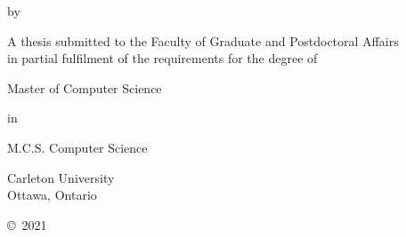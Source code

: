 \makeatletter
\begin{titlepage}
    \begin{center}
      \vspace*{1cm}
      {\Huge\bfseries \@title}

      \vspace{1cm}
      by
      \vspace{1cm}

      {\bfseries \@author}

      \vfill

      A thesis submitted to the Faculty of Graduate and Postdoctoral Affairs\\
      in partial fulfilment of the requirements for the degree of

      \vspace{0.5cm}
      Master of Computer Science

      \vspace{0.5cm}
      in
      \vspace{0.5cm}

      M.C.S. Computer Science

      \vfill

      \vspace{1cm}
      Carleton University\\
      Ottawa, Ontario
      \vspace{1cm}

      \copyright{}~2021 \@author
    \end{center}
\end{titlepage}
\makeatother
